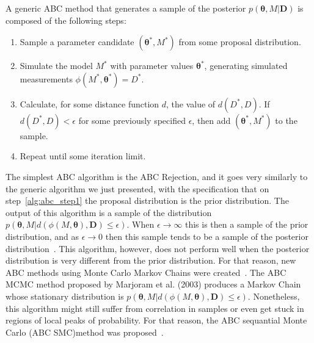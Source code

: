 A generic ABC method that generates a sample of the posterior 
$p ({\bm \theta}, M | {\bm D})$ is composed of the following steps:
\begin{enumerate}
    \item{Sample a parameter candidate $({\bm \theta}^*, M^*)$ from some 
        proposal distribution.} \label{alg:abc_step1}
    \item{Simulate the model $M^*$ with parameter values ${\bm
        \theta}^*$, generating simulated measurements $\phi (M^*,
        {\bm \theta}^*) = D^*$.}
    \item{Calculate, for some distance function $d$, the value of
        $d (D^*, D)$. If $d (D^*, D) < \epsilon$ for some previously
        specified $\epsilon$, then add $({\bm \theta}^*, M^*)$ to the
        sample.}
    \item{Repeat until some iteration limit.}
\end{enumerate}

The simplest ABC algorithm is the ABC Rejection, and it goes very 
similarly to the generic algorithm we just presented, with the 
specification that on step~\ref{alg:abc_step1} the proposal distribution
is the prior distribution. The output of this algorithm is a sample of 
the distribution $p ({\bm \theta}, M| d (\phi (M, {\bm \theta}), {\bm
D}) \leq \epsilon)$. When $\epsilon \to \infty$ this is then a sample of
the prior distribution, and as $\epsilon \to 0$ then this sample tends 
to be a sample of the posterior distribution~\cite{Pritchard1999}. This 
algorithm, however, does not perform well when the posterior 
distribution is very different from the prior distribution. For that 
reason, new ABC methods using Monte Carlo Markov Chains were 
created~\cite{Marjoram2003}. The ABC MCMC method proposed by Marjoram et 
al. (2003) produces a Markov Chain whose stationary distribution is
$p ({\bm \theta}, M | d (\phi (M, {\bm \theta}), {\bm D}) \leq
\epsilon)$. Nonetheless, this algorithm might still suffer from
correlation in samples or even get stuck in regions of local peaks of
probability. For that reason, the ABC sequantial Monte Carlo (ABC
SMC)method was proposed~\cite{Toni2009}.


